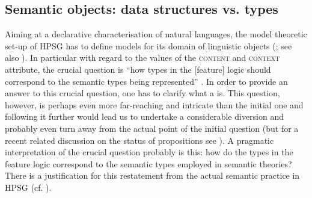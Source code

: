 \documentclass[output=paper
	        ,collection
	        ,collectionchapter
 	        ,biblatex
                ,babelshorthands
                ,newtxmath
                ,draftmode
                ,colorlinks, citecolor=brown
]{langscibook}
\begin{document}
  
\subsection{Semantic objects: data structures vs. types}
\label{sec:semantic-objects}

Aiming at a declarative characterisation of natural languages, the model theoretic set-up of HPSG has to define models for its domain of linguistic objects  (\citealt[Section 3]{Levine:Meurers:2006}; see also ).
%
In particular with regard to the values of the \textsc{content} and \textsc{context} attribute, the crucial question is \enquote{how types in the [feature] logic should correspond to the semantic types being represented}  \citep[]{Penn:2000}.
%
In order to provide an answer to this crucial question, one has to clarify what a  is. 
%
This question, however, is perhaps even more far-reaching and intricate than the initial one and following it further would lead us to undertake a considerable diversion and probably even turn away from the actual point of the initial question (but for a recent related discussion on the status of propositions see \citealt{King:Soames:Speaks:2014}).
%
A pragmatic interpretation of the crucial question probably is this: how do the types in the feature logic correspond to the semantic types employed in semantic theories?
%
There is a justification for this restatement from the actual semantic practice in HPSG (cf. ).
\end{document}
